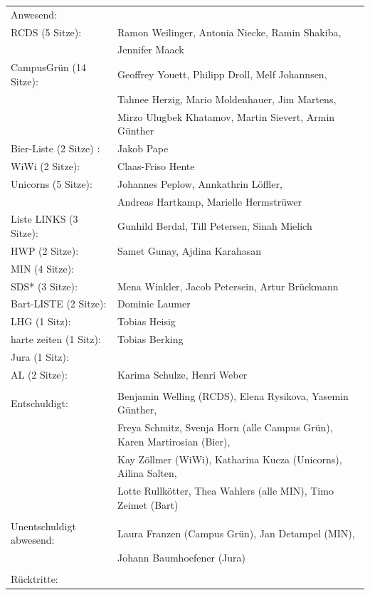 \documentclass[ngerman,headheight=70pt]{scrartcl}
\begin{document}
    \begin{tabular}{ll}
        Anwesend: & \\
            RCDS (5 Sitze): & Ramon Weilinger, Antonia Niecke, Ramin Shakiba, \\
                            & Jennifer Maack \\
             CampusGrün (14 Sitze): & Geoffrey Youett, Philipp Droll, Melf Johannsen, \\
                                   & Tahnee Herzig, Mario Moldenhauer, Jim Martens,\\
                                   & Mirzo Ulugbek Khatamov, Martin Sievert, Armin Günther \\
             Bier-Liste (2 Sitze) : & Jakob Pape \\
             WiWi (2 Sitze): & Claas-Friso Hente \\
             Unicorns (5 Sitze): & Johannes Peplow, Annkathrin Löffler, \\
                                 & Andreas Hartkamp, Marielle Hermstrüwer \\
             Liste LINKS (3 Sitze): & Gunhild Berdal, Till Petersen, Sinah Mielich \\
             HWP (2 Sitze): & Samet Gunay, Ajdina Karahasan \\
             MIN (4 Sitze): & \\
             SDS* (3 Sitze): & Mena Winkler, Jacob Petersein, Artur Brückmann \\
             Bart-LISTE (2 Sitze): & Dominic Laumer \\
             LHG (1 Sitz): & Tobias Heisig \\
             harte zeiten (1 Sitz): & Tobias Berking \\
             Jura (1 Sitz): & \\
             AL (2 Sitze): & Karima Schulze, Henri Weber \\
            & \\
        Entschuldigt: & Benjamin Welling (RCDS), Elena Rysikova, Yasemin Günther,\\
                      & Freya Schmitz, Svenja Horn (alle Campus Grün), Karen Martirosian (Bier), \\
                      & Kay Zöllmer (WiWi), Katharina Kucza (Unicorns), Ailina Salten, \\
                      & Lotte Rullkötter, Thea Wahlers (alle MIN), Timo Zeimet (Bart)\\
                      &\\
        Unentschuldigt abwesend: & Laura Franzen (Campus Grün), Jan Detampel (MIN), \\
                                & Johann Baumhoefener (Jura)\\
                                &\\
        Rücktritte: & \\
    \end{tabular}
\end{document}

